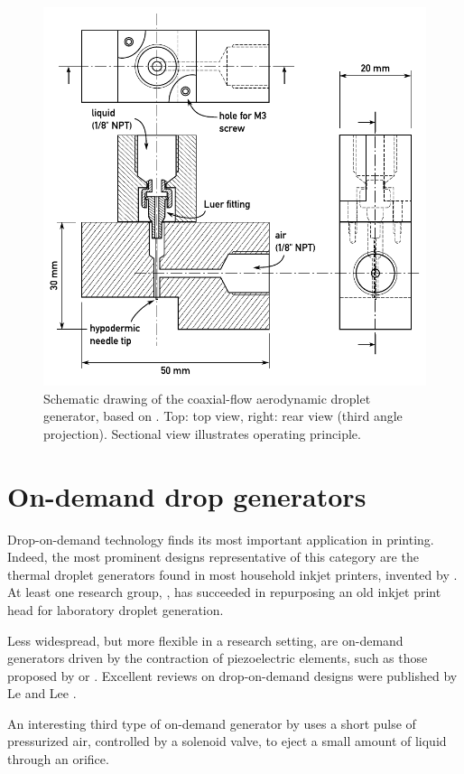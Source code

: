 \documentclass[11.5pt,oneside]{book}
\begin{document}
\begin{figure}
\centering
\includegraphics[width=\textwidth]{img/setup/stry.pdf}
\caption{Schematic drawing of the coaxial-flow aerodynamic droplet generator,
based on \citet{Stry92}. Top: top view, right: rear view (third angle
projection). Sectional view illustrates operating principle.\label{fig:stry}}
\end{figure}

\section{On-demand drop generators}
Drop-on-demand technology finds its most important application in printing.
Indeed, the most prominent designs representative of this category are the thermal droplet
generators found in most household inkjet printers, invented by \citet{Endo88}.
At least one research group, \citet{Sergeyev06}, has succeeded in repurposing
an old inkjet print head for laboratory droplet generation.

Less widespread, but more flexible in a research setting, are on-demand
generators driven by the contraction of piezoelectric elements, such as those
proposed by \citet{Yang97} or \citet{Ulmke99}. Excellent reviews on
drop-on-demand designs were published by Le and Lee \cite{Le98, Lee02}. 

An interesting third type of on-demand generator by \citet{Goghari08} uses a short
pulse of pressurized air, controlled by a solenoid valve, to eject a small
amount of liquid through an orifice.
\end{document}
